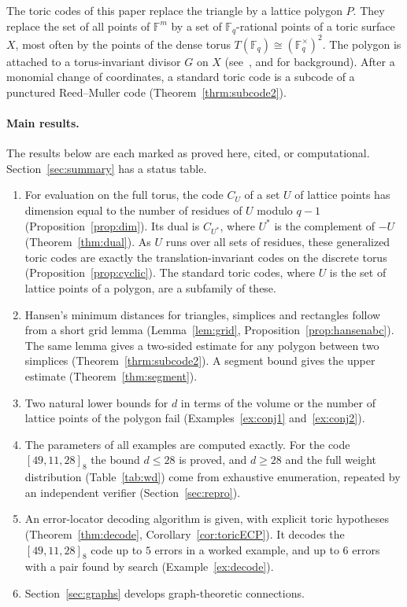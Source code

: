 \documentclass[12pt,letterpaper]{article}
\numberwithin{equation}{section}
\theoremstyle{definition}
\theoremstyle{remark}
\newcommand{\F}{\mathbb{F}}
\newcommand{\Fq}{\mathbb{F}_q}
\newcommand{\Fqs}{\mathbb{F}_q^{\times}}
\begin{document}
The toric codes of this paper replace the triangle by a lattice polygon $P$.
They replace the set of all points of $\F^m$ by a set of $\Fq$-rational points
of a toric surface $X$, most often by the points of the dense torus
$T(\Fq)\cong(\Fqs)^2$. The polygon is attached to a torus-invariant divisor $G$
on $X$ (see~\cite{Ew96}, \cite{Fu93} and \cite{JV02} for background). After a
monomial change of coordinates, a standard toric code is a subcode of a
punctured Reed--Muller code (Theorem~\ref{thrm:subcode2}).

\paragraph{Main results.} The results below are each marked as proved here,
cited, or computational. Section~\ref{sec:summary} has a status table.
\begin{enumerate}[leftmargin=*]
\item For evaluation on the full torus, the code $C_U$ of a set $U$ of lattice
points has dimension equal to the number of residues of $U$ modulo $q-1$
(Proposition~\ref{prop:dim}). Its dual is $C_{U^*}$, where $U^*$ is the
complement of $-U$ (Theorem~\ref{thm:dual}). As $U$ runs over all sets of
residues, these generalized toric codes are exactly the translation-invariant
codes on the discrete torus (Proposition~\ref{prop:cyclic}). The standard
toric codes, where $U$ is the set of lattice points of a polygon, are a
subfamily of these.
\item Hansen's minimum distances for triangles, simplices and rectangles
follow from a short grid lemma (Lemma~\ref{lem:grid},
Proposition~\ref{prop:hansenabc}). The same lemma gives a two-sided estimate
for any polygon between two simplices (Theorem~\ref{thrm:subcode2}). A
segment bound gives the upper estimate (Theorem~\ref{thm:segment}).
\item Two natural lower bounds for $d$ in terms of the volume or the number of
lattice points of the polygon fail (Examples~\ref{ex:conj1}
and~\ref{ex:conj2}).
\item The parameters of all examples are computed exactly. For the code
$[49,11,28]_8$ the bound $d\le28$ is proved, and $d\ge28$ and the full weight
distribution (Table~\ref{tab:wd}) come from exhaustive enumeration, repeated
by an independent verifier (Section~\ref{sec:repro}).
\item An error-locator decoding algorithm is given, with explicit toric
hypotheses (Theorem~\ref{thm:decode}, Corollary~\ref{cor:toricECP}). It decodes the
$[49,11,28]_8$ code up to $5$ errors in a worked example, and up to $6$
errors with a pair found by search (Example~\ref{ex:decode}).
\item Section~\ref{sec:graphs} develops graph-theoretic connections.
\end{enumerate}
\end{document}
